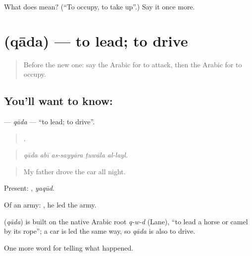 \begin{tcolorbox}[breakable,colback=teal!4,colframe=teal!35!black,title={Before you move on}]
What does  mean? (\textquotedblleft{}To occupy, to take up\textquotedblright{}.) Say it once more.
\end{tcolorbox}
\section[\texorpdfstring{\ar{قاد} (qāda)}{قاد (qāda)}]{ (qāda) — to lead; to drive}

\label{lesson:AR-C339-qada-lead}



\begin{quote}
Before the new one: say the Arabic for to attack, then the Arabic for to occupy.
\end{quote}

\subsection*{You'll want to know: }
\textbf{} — \emph{qāda} — \textquotedblleft{}to lead; to drive\textquotedblright{}.

\begin{quote}
    .
\end{quote}

\begin{quote}
\emph{qāda abī as-sayyāra ṭuwāla al-layl.}
\end{quote}

\begin{quote}
My father drove the car all night.
\end{quote}

Present: , \emph{yaqūd}.

Of an army:  , he led the army.

\begin{cousinweb}
\textbf{} (\emph{qāda}) is built on the native Arabic root \emph{q-w-d} (Lane), \textquotedblleft{}to lead a horse or camel by its rope\textquotedblright{}; a car is led the same way, so \emph{qāda} is also to drive.
\end{cousinweb}

\begin{grammarlens}[title={What you've built}]
One more word for telling what happened.
\end{grammarlens}


